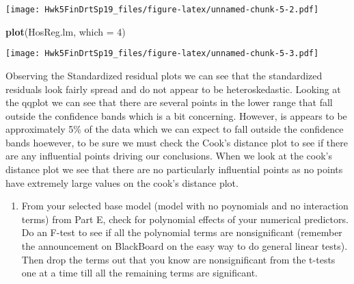\documentclass[]{article}
\newenvironment{Shaded}{\begin{snugshade}}{\end{snugshade}}
\newcommand{\KeywordTok}[1]{\textcolor[rgb]{0.13,0.29,0.53}{\textbf{#1}}}
\newcommand{\DataTypeTok}[1]{\textcolor[rgb]{0.13,0.29,0.53}{#1}}
\newcommand{\DecValTok}[1]{\textcolor[rgb]{0.00,0.00,0.81}{#1}}
\newcommand{\NormalTok}[1]{#1}
\providecommand{\tightlist}{%
  \setlength{\itemsep}{0pt}\setlength{\parskip}{0pt}}
\begin{document}
\texttt{[image: Hwk5FinDrtSp19\_files/figure-latex/unnamed-chunk-5-2.pdf]}

\begin{Shaded}
\begin{Highlighting}[]
\KeywordTok{plot}\NormalTok{(HosReg.lm, }\DataTypeTok{which =} \DecValTok{4}\NormalTok{)}
\end{Highlighting}
\end{Shaded}

\texttt{[image: Hwk5FinDrtSp19\_files/figure-latex/unnamed-chunk-5-3.pdf]}

Observing the Standardized residual plots we can see that the
standardized residuals look fairly spread and do not appear to be
heteroskedastic. Looking at the qqplot we can see that there are several
points in the lower range that fall outside the confidence bands which
is a bit concerning. However, is appears to be approximately 5\% of the
data which we can expect to fall outside the confidence bands hoewever,
to be sure we must check the Cook's distance plot to see if there are
any influential points driving our conclusions. When we look at the
cook's distance plot we see that there are no particularly influential
points as no points have extremely large values on the cook's distance
plot.

\begin{enumerate}
\def\labelenumi{\Alph{enumi})}
\setcounter{enumi}{5}
\tightlist
\item
  From your selected base model (model with no poynomials and no
  interaction terms) from Part E, check for polynomial effects of your
  numerical predictors. Do an F-test to see if all the polynomial terms
  are nonsignificant (remember the announcement on BlackBoard on the
  easy way to do general linear tests). Then drop the terms out that you
  know are nonsignificant from the t-tests one at a time till all the
  remaining terms are significant.
\end{enumerate}
\end{document}
